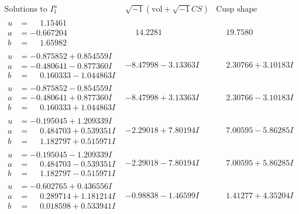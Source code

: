 \documentclass[1p]{elsarticle_modified}
\theoremstyle{definition}
\newcommand{\I}{\sqrt{-1}}
\begin{document}
$$\begin{array}{c|c|c}  
\text{Solutions to }I^u_{1}& \I (\text{vol} + \sqrt{-1}CS) & \text{Cusp shape}\\
 \hline 
\begin{aligned}
u &= \phantom{-}1.15461\phantom{ +0.000000I} \\
a &= -0.667204\phantom{ +0.000000I} \\
b &= \phantom{-}1.65982\phantom{ +0.000000I}\end{aligned}
 & \phantom{-}14.2281\phantom{ +0.000000I} & \phantom{-}19.7580\phantom{ +0.000000I} \\ \hline\begin{aligned}
u &= -0.875852 + 0.854559 I \\
a &= -0.480641 - 0.877360 I \\
b &= \phantom{-}0.160333 - 1.044863 I\end{aligned}
 & -8.47998 - 3.13363 I & \phantom{-}2.30766 + 3.10183 I \\ \hline\begin{aligned}
u &= -0.875852 - 0.854559 I \\
a &= -0.480641 + 0.877360 I \\
b &= \phantom{-}0.160333 + 1.044863 I\end{aligned}
 & -8.47998 + 3.13363 I & \phantom{-}2.30766 - 3.10183 I \\ \hline\begin{aligned}
u &= -0.195045 + 1.209339 I \\
a &= \phantom{-}0.484703 + 0.539351 I \\
b &= \phantom{-}1.182797 + 0.515971 I\end{aligned}
 & -2.29018 + 7.80194 I & \phantom{-}7.00595 - 5.86285 I \\ \hline\begin{aligned}
u &= -0.195045 - 1.209339 I \\
a &= \phantom{-}0.484703 - 0.539351 I \\
b &= \phantom{-}1.182797 - 0.515971 I\end{aligned}
 & -2.29018 - 7.80194 I & \phantom{-}7.00595 + 5.86285 I \\ \hline\begin{aligned}
u &= -0.602765 + 0.436556 I \\
a &= \phantom{-}0.289714 + 1.181214 I \\
b &= \phantom{-}0.018598 + 0.533941 I\end{aligned}
 & -0.98838 - 1.46599 I & \phantom{-}1.41277 + 4.35204 I \\ \hline\begin{aligned}

\end{aligned}
\end{array}$$
\end{document}
